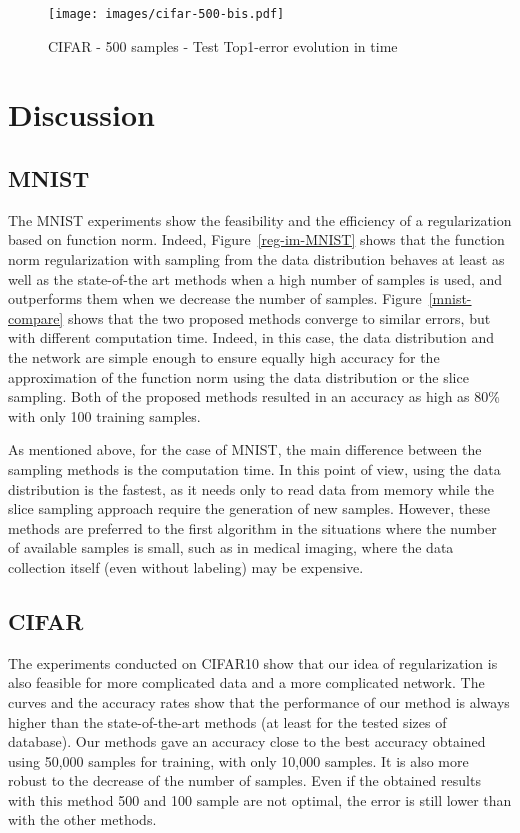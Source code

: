 \documentclass{article}
\begin{document}
\begin{wrapfigure}{R}{7cm}
\centering
\texttt{[image: images/cifar-500-bis.pdf]}
\caption{CIFAR - 500 samples - Test Top1-error evolution in time}
\label{cifar500}
\end{wrapfigure}


\section{Discussion}
\label{discussion}
\subsection{MNIST}
The MNIST experiments show the feasibility and the efficiency of a regularization based on function norm. Indeed, Figure~\ref{reg-im-MNIST} shows that the function norm regularization with sampling from the data distribution behaves at least as well as the state-of-the art methods when a high number of samples is used, and outperforms them when we decrease the number of samples. Figure~\ref{mnist-compare} shows that the two proposed methods converge to similar errors, but with different computation time. Indeed, in this case, the data distribution and the network are simple enough to ensure equally high accuracy for the approximation of the function norm using the data distribution or the slice sampling.  Both of the proposed methods resulted in an accuracy as high as 80\% with only 100 training samples.


As mentioned above, for the case of MNIST, the main difference between the sampling methods is the computation time. In this point of view, using the data distribution is the fastest, as it needs only to read data from memory while the slice sampling approach require the generation of new samples. However, these methods are preferred to the first algorithm in the situations where the number of available samples is small, such as in medical imaging, where the data collection itself (even without labeling) may be expensive. 

\subsection{CIFAR}
The experiments conducted on CIFAR10 show that our idea of regularization is also feasible for more complicated data and a more complicated network. The curves and the accuracy rates show that the performance of our method is always higher than the state-of-the-art methods (at least for the tested sizes of database). Our methods gave an accuracy close to the best accuracy obtained using 50,000 samples for training, with only 10,000 samples. It is also more robust to the decrease of the number of samples. Even if the obtained results with this method 500 and 100 sample are not optimal, the error is still lower than with the other methods. 
\end{document}
